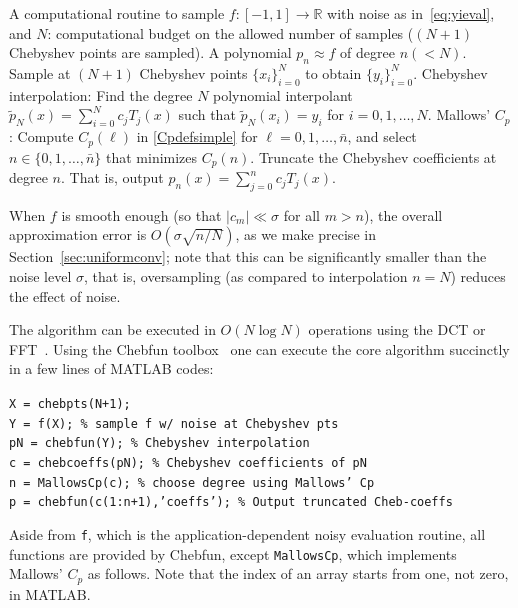 \documentclass[final,onefignum,onetabnum]{siamart220329}
\newcommand{\actionbox}[1]{\begin{tcolorbox}[colback=white,colframe=black,width=\columnwidth,boxsep=5pt,arc=4pt]
  #1
\end{tcolorbox}}
\def\mainalg{NoisyChebtrunc}
\begin{document}
\begin{algorithm}[H]
	\caption{\mainalg: Approximates noisy univariate functions on $[-1,1]$.}
	\label{alg:noisy_interp}
	\begin{algorithmic}[1]
		\Require A computational routine to sample $f:[-1,1]\rightarrow \mathbb{R}$ with noise as in~\eqref{eq:yieval}, 
		and $N$: computational budget on the allowed number of samples ($(N+1)$ Chebyshev points are sampled).
		\Ensure A polynomial $p_n\approx f$ of degree $n(<N)$. 
		\State Sample at $(N+1)$ Chebyshev points 
		$\{x_i\}_{i=0}^N$ to obtain 
		$\{y_i\}_{i=0}^N$. 
		\State Chebyshev interpolation: Find the degree $N$ polynomial interpolant $\tilde p_N(x)=\sum_{i=0}^N c_j T_j(x)$ such that $\tilde p_N(x_i)=y_i$ for $i=0,1,\ldots, N$.  
		\State Mallows' $C_p$: Compute $C_p(\ell)$ in \eqref{Cpdefsimple} for $\ell=0,1,\dots,\bar{n}$, and select $n\in\{0,1,\dots,\bar{n}\}$ that minimizes $C_p(n)$.
		\State Truncate the Chebyshev coefficients at degree $n$. That is, output $p_n(x)=\sum_{j=0}^n c_j T_j(x)$.
	\end{algorithmic}
\end{algorithm}

When $f$ is smooth enough (so that $|c_m|\ll \sigma$ for all $m>n$), the overall approximation error is $O(\sigma\sqrt{{n}/{N}})$, as we make precise in Section~\ref{sec:uniformconv}; note that this can be significantly smaller than the noise level $\sigma$, that is, oversampling (as compared to interpolation $n=N$) reduces the effect of noise. 

The algorithm can be executed in $O(N\log N)$ operations using the DCT or FFT~\cite{trefethenatap}. 
Using the Chebfun toolbox~\cite{chebfunofficial} one can execute the core algorithm succinctly in a few lines of MATLAB codes: 

\actionbox{
	{\tt X = chebpts(N{+1});}\\
	{\tt Y = f(X); \hfill \% sample f w/ noise at Chebyshev pts}\\
	{\tt pN = chebfun(Y); \hfill \% Chebyshev interpolation}\\
	{\tt c = chebcoeffs(pN); \hfill \% Chebyshev coefficients of pN}\\
	{\tt n = MallowsCp(c); \hfill \% choose degree using Mallows' Cp}\\
	{\tt p = chebfun(c(1:n+1),'coeffs'); \hfill\% Output truncated Cheb-coeffs}
}

Aside from {\tt f}, which is the application-dependent noisy evaluation routine, all functions are provided by Chebfun, except 
{\tt MallowsCp}, which implements Mallows' $C_p$ as follows.
Note that the index of an array starts from one, not zero, in MATLAB.
\end{document}
